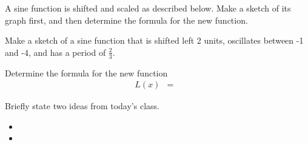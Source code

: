 \begin{problem}
\item A sine function is shifted and scaled as described
  below. Make a sketch of its graph first, and then determine the
  formula for the new function.
  \begin{subproblem}
  \item Make a sketch of a sine function that is shifted left
    2 units, oscillates between -1 and -4, and has a period of $\frac{2}{3}$.

    \item Determine the formula for the new function
      \begin{eqnarray*}
        L(x) & = & 
      \end{eqnarray*}
  \end{subproblem}


\end{problem}

\postClass

\begin{problem}
\item Briefly state two ideas from today's class.
  \begin{itemize}
  \item 
  \item 
  \end{itemize}
\item 
  \begin{subproblem}
    \item
  \end{subproblem}
\end{problem}



